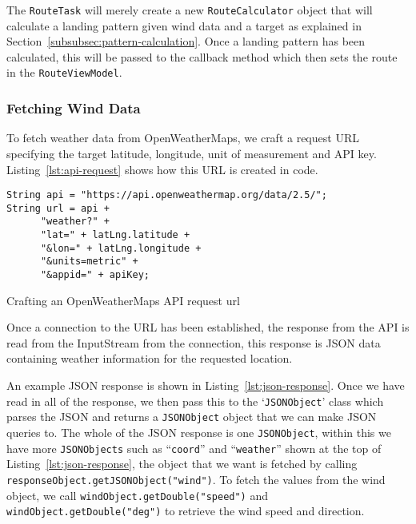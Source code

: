 The \texttt{RouteTask} will merely create a new \texttt{RouteCalculator} object that will calculate a landing pattern given wind data and a target as explained in Section~\vref{subsubsec:pattern-calculation}. Once a landing pattern has been calculated, this will be passed to the callback method which then sets the route in the \texttt{RouteViewModel}.

\subsubsection{Fetching Wind Data}\label{subsubsec:fetching-wind-data}
To fetch weather data from OpenWeatherMaps, we craft a request URL specifying the target latitude, longitude, unit of measurement and API key. Listing~\vref{lst:api-request} shows how this URL is created in code.

\begin{listing}
  \centering
  \begin{verbatim}
String api = "https://api.openweathermap.org/data/2.5/";
String url = api +
      "weather?" +
      "lat=" + latLng.latitude +
      "&lon=" + latLng.longitude +
      "&units=metric" +
      "&appid=" + apiKey;
  \end{verbatim}
  \caption{Crafting an OpenWeatherMaps API request url}\label{lst:api-request}
\end{listing}

Once a connection to the URL has been established, the response from the API is read from the InputStream from the connection, this response is JSON data containing weather information for the requested location.

An example JSON response is shown in Listing~\ref{lst:json-response}. Once we have read in all of the response, we then pass this to the `\texttt{JSONObject}' class which parses the JSON and returns a \texttt{JSONObject} object that we can make JSON queries to. The whole of the JSON response is one \texttt{JSONObject}, within this we have more \texttt{JSONObjects} such as ``\texttt{coord}'' and ``\texttt{weather}'' shown at the top of Listing~\ref{lst:json-response}, the object that we want is fetched by calling \texttt{responseObject.getJSONObject("wind")}. To fetch the values from the wind object, we call \texttt{windObject.getDouble("speed")} and \texttt{windObject.getDouble("deg")} to retrieve the wind speed and direction.

